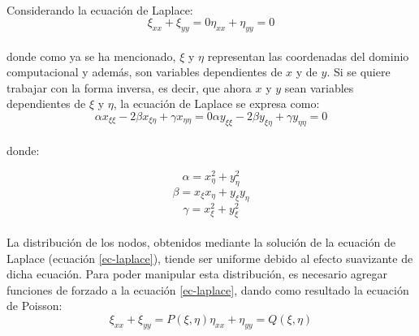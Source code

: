 \documentclass[letterpaper, openright, 12pt]{book}
\begin{document}
		\paragraph*{}
			Considerando la ecuación de Laplace:
			\begin{subequations}
				\begin{equation}
					\xi_{xx} + \xi_{yy} = 0
				\end{equation}
				\begin{equation}
					\eta_{xx} + \eta_{yy} = 0
				\end{equation}
				\label{ec-laplace}
			\end{subequations}\\
			donde como ya se ha mencionado, $\xi$ y $\eta$ representan las coordenadas del dominio computacional y además, son variables dependientes de $x$ y de $y$. Si se quiere trabajar con la forma inversa, es decir, que ahora $x$ y $y$ sean variables dependientes de $\xi$ y $\eta$, la ecuación  de Laplace se expresa como:
			\begin{subequations}
				\begin{equation}
					\alpha x_{\xi \xi} - 2\beta x_{\xi \eta} + \gamma x_{\eta \eta} = 0
				\end{equation}
				\begin{equation}
					\alpha y_{\xi \xi} - 2\beta y_{\xi \eta} + \gamma y_{\eta \eta} = 0
				\end{equation}
				\label{ec-laplace-invertida}
			\end{subequations}\\
			
			donde:
				
			\begin{equation*}
				\alpha = x_{\eta} ^ 2 + y_{\eta}^2
			\end{equation*}
			\begin{equation*}
				\beta = x_{\xi} x_{\eta} + y_{\xi} y_{\eta}
			\end{equation*}
			\begin{equation*}
				\gamma = x_{\xi} ^ 2 + y_{\xi} ^ 2
			\end{equation*}
		
		\paragraph*{}
			La distribución de los nodos, obtenidos mediante la solución de la ecuación de Laplace (ecuación \ref{ec-laplace}),  tiende ser uniforme debido al efecto suavizante de dicha ecuación. Para poder manipular esta distribución, es necesario agregar funciones de forzado a la ecuación \ref{ec-laplace}, dando como resultado la ecuación de Poisson:
			\begin{subequations}
				\begin{equation}
					\xi_{xx} + \xi_{yy} = P(\xi, \eta)
				\end{equation}
				\begin{equation}
					\eta_{xx} + \eta_{yy} = Q(\xi, \eta)
				\end{equation}
				\label{ec-poisson}
			\end{subequations}
		
\end{document}
